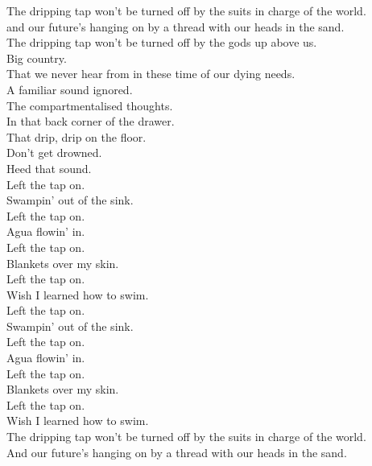 
\label{album:omnium-gatherum}




The dripping tap won't be turned off by the suits in charge of the world. \\
and our future's hanging on by a thread with our heads in the sand. \\
The dripping tap won't be turned off by the gods up above us. \\
Big  country. \\
That we never hear from in these time of our dying needs. \\

A familiar sound ignored. \\
The compartmentalised thoughts. \\
In that back corner of the drawer. \\
That drip, drip on the floor. \\

Don't get drowned. \\
Heed that sound. \\

Left the tap on. \\
Swampin' out of the sink. \\
Left the tap on. \\
Agua flowin' in. \\
Left the tap on. \\
Blankets over my skin. \\
Left the tap on. \\
Wish I learned how to swim. \\

Left the tap on. \\
Swampin' out of the sink. \\
Left the tap on. \\
Agua flowin' in. \\
Left the tap on. \\
Blankets over my skin. \\
Left the tap on. \\
Wish I learned how to swim. \\

The dripping tap won't be turned off by the suits in charge of the world. \\
And our future's hanging on by a thread with our heads in the sand. \\


